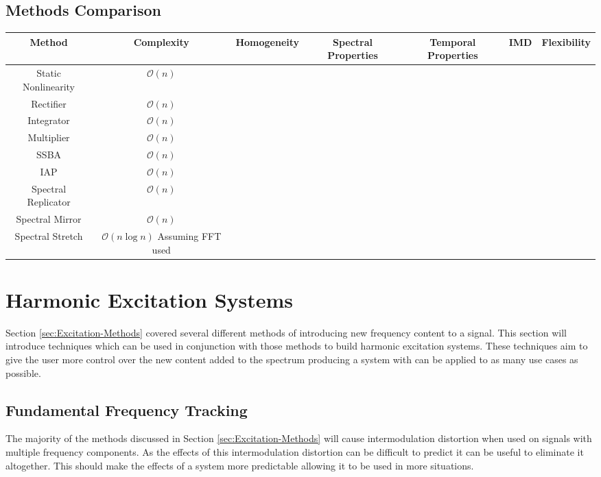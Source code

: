 \begin{landscape}
\section{Methods Comparison}
\label{sec:Excitation-Comparison}

	\begin{tabular}{|c|c|c|c|c|c|c|}
		\hline
		\bf{Method} & \bf{Complexity} & \bf{Homogeneity} & \bf{Spectral Properties} & \bf{Temporal Properties} &
		\bf{IMD} & \bf{Flexibility} \\ %
		\hline
		Static Nonlinearity & $\mathcal{O}(n)$ & & & & & \\
		\hline
		Rectifier & $\mathcal{O}(n)$ & & & & & \\
		\hline
		Integrator & $\mathcal{O}(n)$ & & & & & \\
		\hline
		Multiplier & $\mathcal{O}(n)$ & & & & & \\
		\hline
		SSBA & $\mathcal{O}(n)$ & & & & & \\
		\hline
		IAP & $\mathcal{O}(n)$ & & & & & \\
		\hline
		Spectral Replicator & $\mathcal{O}(n)$ & & & & & \\
		\hline
		Spectral Mirror & $\mathcal{O}(n)$ & & & & & \\
		\hline
		Spectral Stretch & $\mathcal{O}(n\log{n})$ Assuming FFT used & & & & & \\
		\hline
	\end{tabular}

\end{landscape}

\section{Harmonic Excitation Systems}
\label{sec:Excitation-Systems}
	Section \ref{sec:Excitation-Methods} covered several different methods of introducing new frequency content to a
	signal. This section will introduce techniques which can be used in conjunction with those methods to build
	harmonic excitation systems. These techniques aim to give the user more control over the new content added to the
	spectrum producing a system with can be applied to as many use cases as possible.

	\subsection{Fundamental Frequency Tracking}
	\label{sec:Excitation-Fundamental}
		The majority of the methods discussed in Section \ref{sec:Excitation-Methods} will cause intermodulation
		distortion when used on signals with multiple frequency components. As the effects of this intermodulation
		distortion can be difficult to predict it can be useful to eliminate it altogether. This should make the
		effects of a system more predictable allowing it to be used in more situations.

